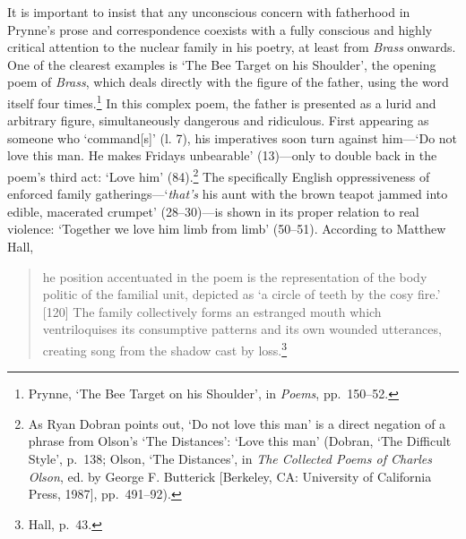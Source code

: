 \documentclass[]{article}
\begin{document}
It is important to insist that any unconscious concern with fatherhood
in Prynne’s prose and correspondence coexists with a fully conscious and
highly critical attention to the nuclear family in his poetry, at least
from \emph{Brass} onwards. One of the clearest examples is ‘The Bee
Target on his Shoulder’, the opening poem of \emph{Brass}, which deals
directly with the figure of the father, using the word itself four
times.\footnote{Prynne, ‘The Bee Target on his Shoulder’, in
  \emph{Poems}, pp.~150–52.} In this complex poem, the father is
presented as a lurid and arbitrary figure, simultaneously dangerous and
ridiculous. First appearing as someone who ‘command{[}s{]}’ (l. 7), his
imperatives soon turn against him—‘Do not love this man. He makes
\textbar{} Fridays unbearable’ (13)—only to double back in the poem’s
third act: ‘Love him’ (84).\footnote{As Ryan Dobran points out, ‘Do not
  love this man’ is a direct negation of a phrase from Olson’s ‘The
  Distances’: ‘Love this man’ (Dobran, ‘The Difficult Style’, p.~138;
  Olson, ‘The Distances’, in \emph{The Collected Poems of Charles
  Olson}, ed. by George F. Butterick {[}Berkeley, CA: University of
  California Press, 1987{]}, pp.~491–92).} The specifically English
oppressiveness of enforced family gatherings—‘\emph{that’s} his
\textbar{} aunt with the brown teapot jammed \textbar{} into edible,
macerated crumpet’ (28–30)—is shown in its proper relation to real
violence: ‘Together we love him limb from \textbar{} limb’ (50–51).
According to Matthew Hall,

\begin{quote}
\singlespacing [t]he position accentuated in the poem is the
representation of the body politic of the familial unit, depicted as ‘a
circle of teeth by the cosy fire.’ {[}120{]} The family collectively
forms an estranged mouth which ventriloquises its consumptive patterns
and its own wounded utterances, creating song from the shadow cast by
loss.\footnote{Hall, p.~43.}
\end{quote}
\end{document}
